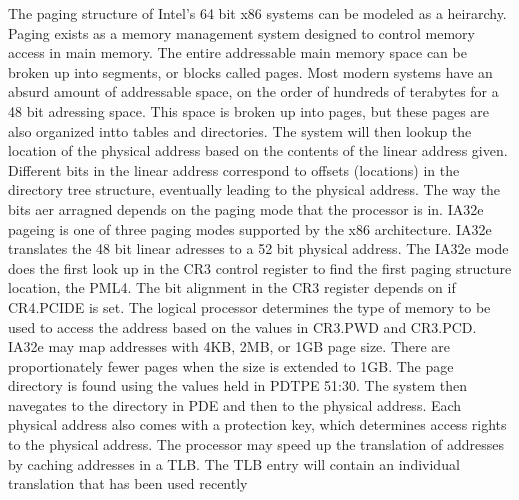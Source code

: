 \documentclass[letterpaper,10pt,titlepage,fleqn]{article}
\begin{document}
    The paging structure of Intel's 64 bit x86 systems can be modeled as a heirarchy. Paging exists as a memory management system
    designed to control memory access in main memory. The entire addressable main memory space can be broken up into segments, 
    or blocks called pages. Most modern systems have an absurd amount of addressable space, on the order of hundreds of terabytes for 
    a 48 bit adressing space. This space is broken up into pages, but these pages are also organized intto tables and directories. 
    The system will then lookup the location of the physical address based on the contents of the linear address given. Different bits
    in the linear address correspond to offsets (locations) in the directory tree structure, eventually leading to the physical address.
    The way the bits aer arragned depends on the paging mode that the processor is in. IA32e pageing is one of three paging modes 
    supported by the x86 architecture. IA32e translates the 48 bit linear adresses to a 52 bit physical address. The IA32e mode does
    the first look up in the CR3 control register to find the first paging structure location, the PML4. The bit alignment in the CR3 
    register depends on if CR4.PCIDE is set. The logical processor determines the type of memory to be used to access the address based
    on the values in CR3.PWD and CR3.PCD. IA32e may map addresses with 4KB, 2MB, or 1GB page size. There are proportionately fewer pages
    when the size is extended to 1GB. The page directory is found using the values held in PDTPE 51:30. The system then navegates to 
    the directory in PDE and then to the physical address. Each physical address also comes with a protection key, which determines 
    access rights to the physical address. The processor may speed up the translation of addresses by caching addresses in a TLB.
    The TLB entry will contain an individual translation that has been used recently
    
\pagebreak
\end{document}
